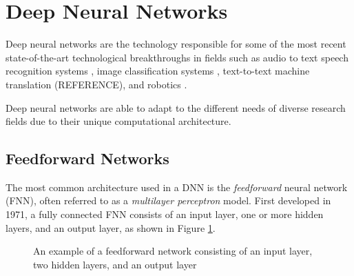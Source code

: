 \section{Deep Neural Networks}\label{sec:deep_neural_networks}
Deep neural networks are the technology responsible for some of the most recent state-of-the-art technological breakthroughs in fields such as audio to text speech recognition systems \cite{Hinton2012}, image classification systems \cite{Krizhevsky2012, Simonyan2014, Szegedy2015, He2016}, text-to-text machine translation (REFERENCE), and robotics \cite{Mnih2015, Lillicrap2015, Schulman2015, Schulman2015highdimensional}.

Deep neural networks are able to adapt to the different needs of diverse research fields due to their unique computational architecture.




\subsection{Feedforward Networks}
The most common architecture used in a DNN is the \textit{feedforward} neural network (FNN), often referred to as a \textit{multilayer perceptron} model. First developed in 1971, a fully connected FNN consists of an input layer, one or more hidden layers, and an output layer, as shown in Figure \ref{fig:2302_feedforward_network}.

\begin{figure}[h]
	\centering
	
	\caption[Feedforward network example]{An example of a feedforward network consisting of an input layer, two hidden layers, and an output layer}
	\label{fig:2302_feedforward_network}
\end{figure}

